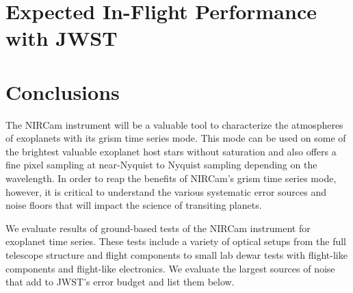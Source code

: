 \documentclass{aastex62}
\begin{document}
\clearpage
\section{Expected In-Flight Performance with JWST}

\section{Conclusions}
The NIRCam instrument will be a valuable tool to characterize the atmospheres of exoplanets with its grism time series mode.
This mode can be used on some of the brightest valuable exoplanet host stars without saturation and also offers a fine pixel sampling at near-Nyquist to Nyquist sampling depending on the wavelength.
In order to reap the benefits of NIRCam's grism time series mode, however, it is critical to understand the various systematic error sources and noise floors that will impact the science of transiting planets.

We evaluate results of ground-based tests of the NIRCam instrument for exoplanet time series.
These tests include a variety of optical setups from the full telescope structure and flight components to small lab dewar tests with flight-like components and flight-like electronics.
We evaluate the largest sources of noise that add to JWST's error budget and list them below.
\end{document}
